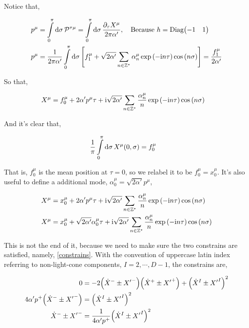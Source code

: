 Notice that,

\begin{align*}
    p^\mu&=\int\limits_0^\pi\dd{\sigma}\mathcal P^{\tau\mu}=\int\limits_0^\pi\dd{\sigma}\frac{\partial_\tau X^\mu}{2\pi\alpha'},\ \ \ \textnormal{Because }h=\textnormal{Diag}\mqty(-1&1)\\
    p^\mu&=\frac{1}{2\pi\alpha'}\int\limits_0^\pi\dd{\sigma}\qty[f_1^\mu+\sqrt{2\alpha'}\sum\limits_{n\in\mathbb Z^\ast}\alpha_n^\mu\exp\qty(-\im n\tau)\cos\qty(n\sigma)]=\frac{f_1^\mu}{2\alpha'}   
\end{align*}

So that,

\begin{align*}
    X^\mu&=f_0^\mu+2\alpha' p^\mu\tau+\textnormal{i}\sqrt{2\alpha'}\sum\limits_{n\in\mathbb Z^\ast}\frac{\alpha_n^\mu}{n}\exp\qty(-\textnormal{i} n\tau)\cos\qty(n\sigma)   
\end{align*}

And it's clear that,

\begin{align*}
    \frac1\pi\int\limits_0^{\pi}\dd{\sigma}X^\mu\qty(0,\sigma)&=f_0^\mu
\end{align*}

That is, $f_0^\mu$ is the mean position at $\tau=0$, so we relabel it to be $f_0^\mu=x_0^\mu$. It's also useful to define a additional mode, $\alpha_0^\mu=\sqrt{2\alpha'}p^\mu$,

\begin{align*}
    X^\mu&=x_0^\mu+2\alpha' p^\mu\tau+\textnormal{i}\sqrt{2\alpha'}\sum\limits_{n\in\mathbb Z^\ast}\frac{\alpha_n^\mu}{n}\exp\qty(-\textnormal{i} n\tau)\cos\qty(n\sigma)\\
    X^\mu&=x_0^\mu+\sqrt{2\alpha'} \alpha_0^\mu\tau+\textnormal{i}\sqrt{2\alpha'}\sum\limits_{n\in\mathbb Z^\ast}\frac{\alpha_n^\mu}{n}\exp\qty(-\textnormal{i} n\tau)\cos\qty(n\sigma)   
\end{align*}

This is not the end of it, because we need to make sure the two constrains are satisfied, namely, \ref{constrains}. With the convention of 
uppercase latin index referring to non-light-cone components, $I=2,\cdots,D-1$, the constrains are,

\begin{align*}
    0&=-2\qty({\dot X}^-\pm{X'}^-)\qty({\dot X}^+\pm{X'}^+)+\qty({\dot X}^I\pm{X'}^I)^2\\
    4\alpha'p^+\qty({\dot X}^-\pm{X'}^-)&=\qty({\dot X}^I\pm{X'}^I)^2\\
    {\dot X}^-\pm{X'}^-&=\frac{1}{4\alpha'p^+}\qty({\dot X}^I\pm{X'}^I)^2
\end{align*}

